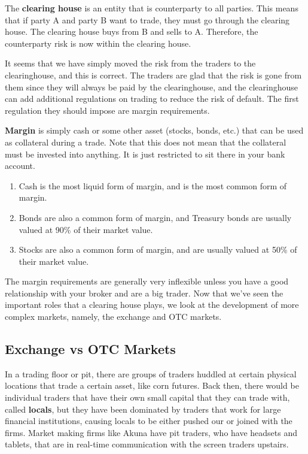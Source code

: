 \documentclass{article}
\begin{document}
    \begin{definition}
      The \textbf{clearing house} is an entity that is counterparty to all parties. This means that if party A and party B want to trade, they must go through the clearing house. The clearing house buys from B and sells to A. Therefore, the counterparty risk is now within the clearing house.
    \end{definition}

    It seems that we have simply moved the risk from the traders to the clearinghouse, and this is correct. The traders are glad that the risk is gone from them since they will always be paid by the clearinghouse, and the clearinghouse can add additional regulations on trading to reduce the risk of default. The first regulation they should impose are margin requirements. 

    \begin{definition}[Margin]
      \textbf{Margin} is simply cash or some other asset (stocks, bonds, etc.) that can be used as collateral during a trade. Note that this does not mean that the collateral must be invested into anything. It is just restricted to sit there in your bank account. 
      \begin{enumerate}
        \item Cash is the most liquid form of margin, and is the most common form of margin. 
        \item Bonds are also a common form of margin, and Treasury bonds are usually valued at 90\% of their market value.
        \item Stocks are also a common form of margin, and are usually valued at 50\% of their market value. 
      \end{enumerate}
    \end{definition}

    The margin requirements are generally very inflexible unless you have a good relationship with your broker and are a big trader. Now that we've seen the important roles that a clearing house plays, we look at the development of more complex markets, namely, the exchange and OTC markets. 

  \subsection{Exchange vs OTC Markets}

    In a trading floor or pit, there are groups of traders huddled at certain physical locations that trade a certain asset, like corn futures. Back then, there would be individual traders that have their own small capital that they can trade with, called \textbf{locals}, but they have been dominated by traders that work for large financial institutions, causing locals to be either pushed our or joined with the firms. Market making firms like Akuna have pit traders, who have headsets and tablets, that are in real-time communication with the screen traders upstairs. 
\end{document}
